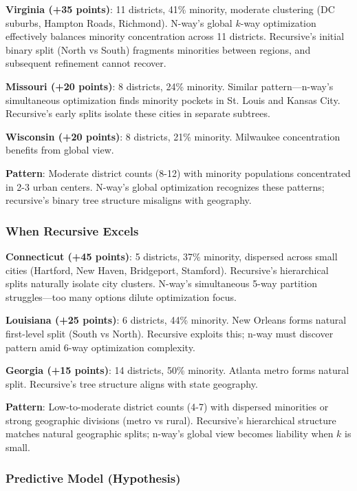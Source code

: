 \textbf{Virginia (+35 points)}: 11 districts, 41\% minority, moderate clustering (DC suburbs, Hampton Roads, Richmond). N-way's global $k$-way optimization effectively balances minority concentration across 11 districts. Recursive's initial binary split (North vs South) fragments minorities between regions, and subsequent refinement cannot recover.

\textbf{Missouri (+20 points)}: 8 districts, 24\% minority. Similar pattern—n-way's simultaneous optimization finds minority pockets in St. Louis and Kansas City. Recursive's early splits isolate these cities in separate subtrees.

\textbf{Wisconsin (+20 points)}: 8 districts, 21\% minority. Milwaukee concentration benefits from global view.

\textbf{Pattern}: Moderate district counts (8-12) with minority populations concentrated in 2-3 urban centers. N-way's global optimization recognizes these patterns; recursive's binary tree structure misaligns with geography.

\subsubsection{When Recursive Excels}

\textbf{Connecticut (+45 points)}: 5 districts, 37\% minority, dispersed across small cities (Hartford, New Haven, Bridgeport, Stamford). Recursive's hierarchical splits naturally isolate city clusters. N-way's simultaneous 5-way partition struggles—too many options dilute optimization focus.

\textbf{Louisiana (+25 points)}: 6 districts, 44\% minority. New Orleans forms natural first-level split (South vs North). Recursive exploits this; n-way must discover pattern amid 6-way optimization complexity.

\textbf{Georgia (+15 points)}: 14 districts, 50\% minority. Atlanta metro forms natural split. Recursive's tree structure aligns with state geography.

\textbf{Pattern}: Low-to-moderate district counts (4-7) with dispersed minorities or strong geographic divisions (metro vs rural). Recursive's hierarchical structure matches natural geographic splits; n-way's global view becomes liability when $k$ is small.

\subsubsection{Predictive Model (Hypothesis)}

